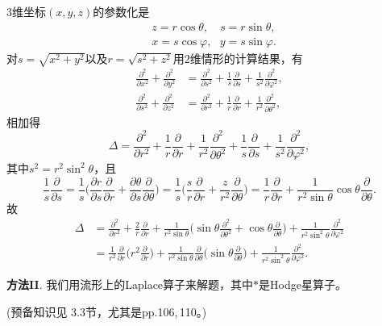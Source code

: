\begin{itemize}
    $3$维坐标$(x,y,z)$的参数化是
    \begin{align*}
    &z=r\cos\theta,\quad s=r\sin\theta,\\
    &x=s\cos\varphi,\ \ \ y=s\sin\varphi.
    \end{align*}
    对$s=\sqrt{x^2+y^2}$以及$r=\sqrt{s^2+z^2}$用$2$维情形的计算结果，有
    \begin{align*}
    \frac{\partial^2}{\partial x^2}+\frac{\partial^2}{\partial y^2}
    &=\frac{\partial^2}{\partial s^2}
    +\frac{1}{s}\frac{\partial}{\partial s}
    +\frac{1}{s^2}\frac{\partial^2}{\partial\varphi^2},\\
    \frac{\partial^2}{\partial s^2}+\frac{\partial^2}{\partial z^2}
    &=\frac{\partial^2}{\partial r^2}
    +\frac{1}{r}\frac{\partial}{\partial r}
    +\frac{1}{r^2}\frac{\partial^2}{\partial\theta^2},
    \end{align*}
    相加得
    $$\Delta=\frac{\partial^2}{\partial r^2}+\frac{1}{r}\frac{\partial}{\partial r}
    +\frac{1}{r^2}\frac{\partial^2}{\partial\theta^2}
    +\frac{1}{s}\frac{\partial}{\partial s}
    +\frac{1}{s^2}\frac{\partial^2}{\partial\varphi^2},$$
    其中$s^2=r^2\sin^2\theta$，且
    $$\frac{1}{s}\frac{\partial}{\partial s}
    =\frac{1}{s}\bigg(\frac{\partial r}{\partial s}\frac{\partial}{\partial r}
    +\frac{\partial\theta}{\partial s}\frac{\partial}{\partial\theta}\bigg)
    =\frac{1}{s}\bigg(\frac{s}{r}\frac{\partial}{\partial r}
    +\frac{z}{r^2}\frac{\partial}{\partial\theta}\bigg)
    =\frac{1}{r}\frac{\partial}{\partial r}
    +\frac{1}{r^2\sin\theta}\cos\theta\frac{\partial}{\partial\theta}.$$
    故
    \begin{align*}
    \Delta&=\frac{\partial^2}{\partial r^2}+\frac{2}{r}\frac{\partial}{\partial r}
    +\frac{1}{r^2\sin\theta}\bigg(\!\sin\theta\frac{\partial^2}{\partial\theta^2}+\cos\theta\frac{\partial}{\partial\theta}\bigg)
    +\frac{1}{r^2\sin^2\theta}\frac{\partial^2}{\partial\varphi^2}\\
    &=\frac{1}{r^2}\frac{\partial}{\partial r}\bigg(r^2\frac{\partial}{\partial r}\bigg)
    +\frac{1}{r^2\sin\theta}\frac{\partial}{\partial\theta}\bigg(\!\sin\theta\frac{\partial}{\partial\theta}\bigg)
    +\frac{1}{r^2\sin^2\theta}\frac{\partial^2}{\partial\varphi^2}.
    \end{align*}

    \textbf{方法II}.
        我们用流形上的Laplace算子来解题，其中$*$是Hodge星算子。

        (预备知识见\cite{Jo} 3.3节，尤其是pp.106,\,110。)
        

\end{itemize}

